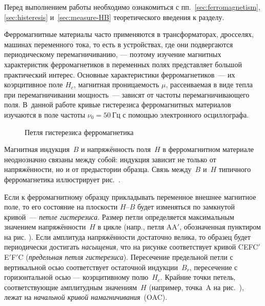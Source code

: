 \label{lab:4-5}



Перед выполнением работы необходимо ознакомиться с
пп.~\ref{sec:ferromagnetism}, \ref{sec:histeresis} и~\ref{sec:measure-HB} 
теоретического введения к разделу.


Ферромагнитные материалы часто применяются в трансформаторах, дросселях, машинах
переменного тока, то есть в устройствах, где они подвергаются периодическому
перемагничиванию, --- поэтому изучение магнитных характеристик 
ферромагнетиков в переменных полях представляет большой практический интерес. 
Основные характеристики ферромагнетиков~--- их коэрцитивное поле
$H_c$, магнитная проницаемость $\mu$, 
рассеиваемая в виде тепла при перемагничивании мощность~--- зависят
от частоты перемагничивающего поля. В~данной работе
кривые гистерезиса ферромагнитных материалов изучаются в поле частоты
$\nu_0 = 50~Гц$ с помощью электронного осциллографа.

\begin{figure}[h!]
    \centering
    \caption{Петля гистерезиса ферромагнетика}
\end{figure}

Магнитная индукция~${B}$ и напряжённость поля~${H}$ в ферромагнитном материале 
неоднозначно связаны между собой: индукция зависит не только от напряжённости, 
но и от предыстории образца. Связь между~$B$ и~$H$ типичного ферромагнетика 
иллюстрирует рис.~.


Если к ферромагнитному образцу прикладывать переменное внешнее магнитное поле,
то его состояние на плоскости $H$--$B$ будет изменяться по замкнутой кривой~---
\emph{петле гистерезиса}. Размер петли определяется максимальным
значением напряжённости~$H$ в цикле (напр.,
петля AA$'$, обозначенная пунктиром на рис. ). 
Если амплитуда напряжённости достаточно
велика, то образец будет периодически достигать \emph{насыщения}, 
что на рисунке соответствует кривой CEFC$'$E$'$F$'$C
(\emph{предельная петля гистерезиса}).
Пересечение предельной петли с вертикальной осью соответствует
остаточной индукции~$B_r$, пересечение с горизонтальной осью ---
коэрцитивному полю~$H_c$.
Крайние точки петель, соответствующие амплитудным значениям~$H$ 
(например, точка~A на рис.~), лежат на 
\emph{начальной кривой намагничивания}~(OAC).

